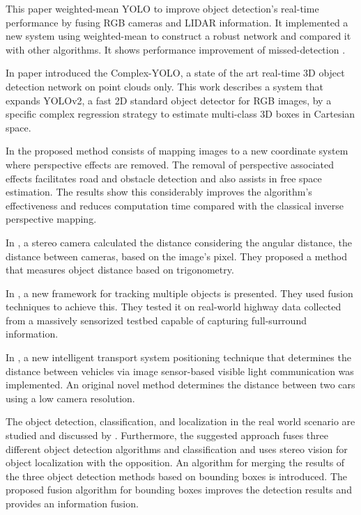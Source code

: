 This paper weighted-mean YOLO to improve object detection's real-time performance by fusing RGB cameras and LIDAR information. It implemented a new system using weighted-mean to construct a robust network and compared it with other algorithms. It shows performance improvement of missed-detection \cite{Kim2019}.

In paper \cite{Simon2019} introduced the Complex-YOLO, a state of the art real-time 3D object detection network on point clouds only. This work describes a system that expands YOLOv2, a fast 2D standard object detector for RGB images, by a specific complex regression strategy to estimate multi-class 3D boxes in Cartesian space. 

In \cite{Oliveira2015} the proposed method consists of mapping images to a new coordinate system where perspective effects are removed. The removal of perspective associated effects facilitates road and obstacle detection and also assists in free space estimation. The results show this considerably improves the algorithm's effectiveness and reduces computation time compared with the classical inverse perspective mapping.

In \cite{Salman2017}, a stereo camera calculated the distance considering the angular distance, the distance between cameras, based on the image's pixel. They proposed a method that measures object distance based on trigonometry.   

 In \cite{Rangesh2019}, a new framework for tracking multiple objects is presented. They used fusion techniques to achieve this. They tested it on real-world highway data collected from a massively sensorized testbed capable of capturing full-surround information.

In \cite{Tram2018}, a new intelligent transport system positioning technique that determines the distance between vehicles via image sensor-based visible light communication was implemented. An original novel method determines the distance between two cars using a low camera resolution.

The object detection, classification, and localization in the real world scenario are studied and discussed by \cite{Hofmann2019}. Furthermore, the suggested approach fuses three different object detection algorithms and classification and uses stereo vision for object localization with the opposition. An algorithm for merging the results of the three object detection methods based on bounding boxes is introduced. The proposed fusion algorithm for bounding boxes improves the detection results and provides an information fusion.







